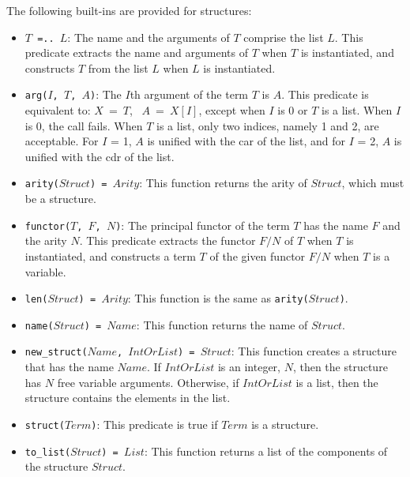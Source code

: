 The following built-ins are provided for structures:
\begin{itemize}
\item \texttt{$T$\ =..\ $L$}: The name and the arguments of $T$ comprise the list $L$. This predicate extracts the name and arguments of $T$ when $T$ is instantiated, and constructs $T$ from the list $L$ when $L$ is instantiated.

\item \texttt{arg($I$, $T$, $A$)}: The $I$th argument of the term $T$ is $A$. This predicate is equivalent to: $X$\ =\ $T$, \ $A$\ =\ $X[I]$, except when $I$ is 0 or $T$ is a list. When $I$ is 0, the call fails. When $T$ is a list, only two indices, namely 1 and 2, are acceptable. For $I$ = 1, $A$ is unified with the car of the list, and for $I$ = 2, $A$ is unified with the cdr of the list.
\item \texttt{arity($Struct$) = $Arity$}: This function returns the arity of $Struct$, which must be a structure.

\item \texttt{functor($T$, $F$, $N$)}: The principal functor of the term $T$ has the name $F$ and the arity $N$. This predicate extracts the functor $F/N$ of $T$ when $T$ is instantiated, and constructs a term $T$ of the given functor $F/N$ when $T$ is a variable.

\item \texttt{len($Struct$) = $Arity$}: This function is the same as \texttt{arity($Struct$)}.
\item \texttt{name($Struct$) = $Name$}: This function returns the name of $Struct$.
\item \texttt{new\_struct($Name$, $IntOrList$) = $Struct$}: This function creates a structure that has the name $Name$.  If $IntOrList$ is an integer, $N$, then the structure has $N$ free variable arguments.  Otherwise, if $IntOrList$ is a list, then the structure contains the elements in the list.  
\item \texttt{struct($Term$)}: This predicate is true if $Term$ is a structure.
\item \texttt{to\_list($Struct$) = $List$}: This function returns a list of the components of the structure $Struct$.
\end{itemize}

